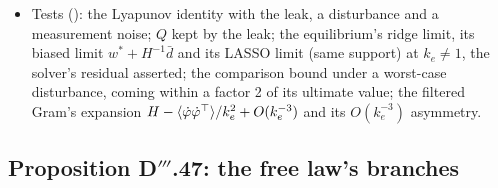 \begin{itemize}
    $3.9\cdot10^{-6}$--$2.5\cdot10^{-4}$, dense; over all 1760 3-sparse patterns the support is exactly the truth's for
    415, the LASSO's prediction holds for 416, the two agree on 1745; with a correlated disturbance bias the equilibrium
    tends to $w^* + H^{-1}\bar d$ as $\sigma\to0$, linearly; from the rich start it is reached at
    $t\approx3.2\cdot10^5$, at $2\cdot10^6$ where the irrepresentable condition fails (five atoms kept).
  \item Tests (): the Lyapunov identity with the leak, a disturbance and a measurement
    noise; $Q$ kept by the leak; the equilibrium's ridge limit, its biased limit $w^* + H^{-1}\bar d$ and its LASSO limit
    (same support) at $k_e\ne1$, the solver's residual asserted; the comparison bound under a worst-case disturbance,
    coming within a factor 2 of its ultimate value; the filtered Gram's expansion
    $H - \langle\dot\varphi\dot\varphi^\top\rangle/k_e^2 + O(k_e^{-3})$ and its $O(k_e^{-3})$ asymmetry.
\end{itemize}

\subsection{Proposition D\texorpdfstring{$'''$}{'''}.47: the free law's branches}

